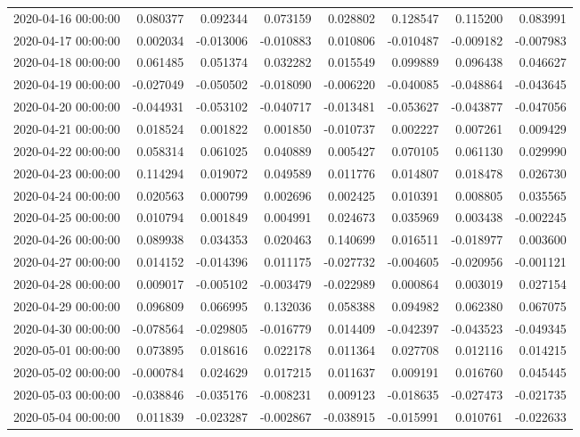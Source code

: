 \begin{tabular}{lrrrrrrr}
2020-04-16 00:00:00 & 0.080377 & 0.092344 & 0.073159 & 0.028802 & 0.128547 & 0.115200 & 0.083991 \\
2020-04-17 00:00:00 & 0.002034 & -0.013006 & -0.010883 & 0.010806 & -0.010487 & -0.009182 & -0.007983 \\
2020-04-18 00:00:00 & 0.061485 & 0.051374 & 0.032282 & 0.015549 & 0.099889 & 0.096438 & 0.046627 \\
2020-04-19 00:00:00 & -0.027049 & -0.050502 & -0.018090 & -0.006220 & -0.040085 & -0.048864 & -0.043645 \\
2020-04-20 00:00:00 & -0.044931 & -0.053102 & -0.040717 & -0.013481 & -0.053627 & -0.043877 & -0.047056 \\
2020-04-21 00:00:00 & 0.018524 & 0.001822 & 0.001850 & -0.010737 & 0.002227 & 0.007261 & 0.009429 \\
2020-04-22 00:00:00 & 0.058314 & 0.061025 & 0.040889 & 0.005427 & 0.070105 & 0.061130 & 0.029990 \\
2020-04-23 00:00:00 & 0.114294 & 0.019072 & 0.049589 & 0.011776 & 0.014807 & 0.018478 & 0.026730 \\
2020-04-24 00:00:00 & 0.020563 & 0.000799 & 0.002696 & 0.002425 & 0.010391 & 0.008805 & 0.035565 \\
2020-04-25 00:00:00 & 0.010794 & 0.001849 & 0.004991 & 0.024673 & 0.035969 & 0.003438 & -0.002245 \\
2020-04-26 00:00:00 & 0.089938 & 0.034353 & 0.020463 & 0.140699 & 0.016511 & -0.018977 & 0.003600 \\
2020-04-27 00:00:00 & 0.014152 & -0.014396 & 0.011175 & -0.027732 & -0.004605 & -0.020956 & -0.001121 \\
2020-04-28 00:00:00 & 0.009017 & -0.005102 & -0.003479 & -0.022989 & 0.000864 & 0.003019 & 0.027154 \\
2020-04-29 00:00:00 & 0.096809 & 0.066995 & 0.132036 & 0.058388 & 0.094982 & 0.062380 & 0.067075 \\
2020-04-30 00:00:00 & -0.078564 & -0.029805 & -0.016779 & 0.014409 & -0.042397 & -0.043523 & -0.049345 \\
2020-05-01 00:00:00 & 0.073895 & 0.018616 & 0.022178 & 0.011364 & 0.027708 & 0.012116 & 0.014215 \\
2020-05-02 00:00:00 & -0.000784 & 0.024629 & 0.017215 & 0.011637 & 0.009191 & 0.016760 & 0.045445 \\
2020-05-03 00:00:00 & -0.038846 & -0.035176 & -0.008231 & 0.009123 & -0.018635 & -0.027473 & -0.021735 \\
2020-05-04 00:00:00 & 0.011839 & -0.023287 & -0.002867 & -0.038915 & -0.015991 & 0.010761 & -0.022633 \\

\end{tabular}
